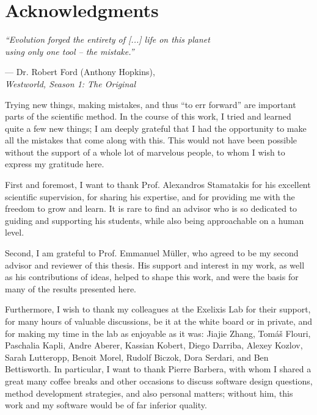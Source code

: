 
\chapter*{Acknowledgments}

\epigraph
{\textit{``Evolution forged the entirety of [...] life on this planet \\ using only one tool -- the mistake.''}}
{--- Dr. Robert Ford (Anthony Hopkins),\\ \textit{Westworld, Season 1: The Original}}

Trying new things, making mistakes, and thus ``to err forward'' are important parts of the scientific method.
In the course of this work, I tried and learned quite a few new things;
I am deeply grateful that I had the opportunity to make all the mistakes that come along with this.
This would not have been possible without the support of a whole lot of marvelous people,
to whom I wish to express my gratitude here.

First and foremost, I want to thank Prof. Alexandros Stamatakis for his excellent scientific supervision,
for sharing his expertise, and for providing me with the freedom to grow and learn.
It is rare to find an advisor who is so dedicated to guiding and supporting his students,
while also being approachable on a human level.

Second, I am grateful to Prof. Emmanuel M\"uller, who agreed to be my second advisor and reviewer of this thesis.
His support and interest in my work, as well as his contributions of ideas, helped to shape this work,
and were the basis for many of the results presented here.

Furthermore, I wish to thank my colleagues at the Exelixis Lab for their support, for many hours of valuable discussions,
be it at the white board or in private, and for making my time in the lab as enjoyable as it was:
Jiajie Zhang, Tom{\'{a}}{\v{s}} Flouri, Paschalia Kapli, Andre Aberer, Kassian Kobert, Diego Darriba, Alexey Kozlov,
Sarah Lutteropp, Benoit Morel, Rudolf Biczok, Dora Serdari, and Ben Bettisworth.
In particular, I want to thank Pierre Barbera, with whom I shared a great many coffee breaks and other occasions
to discuss software design questions, method development strategies, and also personal matters;
without him, this work and my software would be of far inferior quality.

